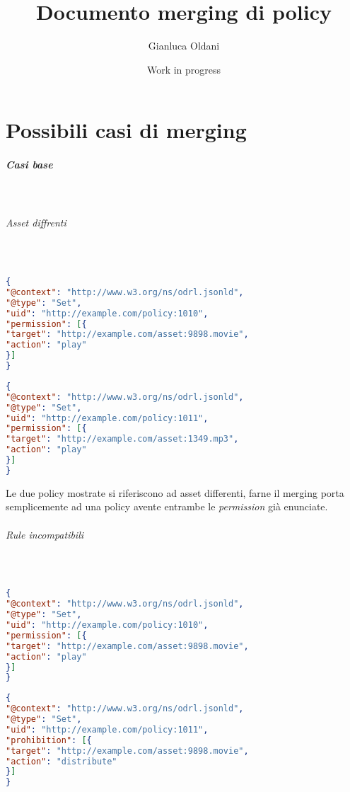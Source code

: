 \documentclass[12pt,a4paper,twoside]{book}
\title{Documento merging di policy}
\date{Work in progress}
\author{Gianluca Oldani}
\begin{document}
\maketitle
\newpage
{}
\chapter{Possibili casi di merging}
\paragraph{Casi base}\mbox{}\\
\subparagraph{Asset diffrenti}\mbox{}\\
\begin{lstlisting}[language=json,firstnumber=1,caption={La policy 1010 permette di riprodurre l'asset 9898.movie a chiunque},captionpos=b]
{
"@context": "http://www.w3.org/ns/odrl.jsonld",
"@type": "Set",
"uid": "http://example.com/policy:1010",
"permission": [{
"target": "http://example.com/asset:9898.movie",
"action": "play"
}]
}
\end{lstlisting}
\begin{lstlisting}[language=json,firstnumber=1,caption={La policy 1011 consente la riproduzione dell'asset 1349.mp3 a chiunque},captionpos=b]
{
"@context": "http://www.w3.org/ns/odrl.jsonld",
"@type": "Set",
"uid": "http://example.com/policy:1011",
"permission": [{
"target": "http://example.com/asset:1349.mp3",
"action": "play"
}]
}
\end{lstlisting}
Le due policy mostrate si riferiscono ad asset differenti, farne il merging porta semplicemente ad una policy avente entrambe le \textit{permission} già enunciate.
\subparagraph{Rule incompatibili}\mbox{}\\
\begin{lstlisting}[language=json,firstnumber=1,caption={La policy 1010 consente la riproduzione dell'asset 9898.movie a chiunque},captionpos=b]
{
"@context": "http://www.w3.org/ns/odrl.jsonld",
"@type": "Set",
"uid": "http://example.com/policy:1010",
"permission": [{
"target": "http://example.com/asset:9898.movie",
"action": "play"
}]
}
\end{lstlisting}
\begin{lstlisting}[language=json,firstnumber=1,caption={La policy 1011 proibisce la distribuzione dell'asset 9898.movie a chiunque},captionpos=b]
{
"@context": "http://www.w3.org/ns/odrl.jsonld",
"@type": "Set",
"uid": "http://example.com/policy:1011",
"prohibition": [{
"target": "http://example.com/asset:9898.movie",
"action": "distribute"
}]
}
\end{lstlisting}
\end{document}
